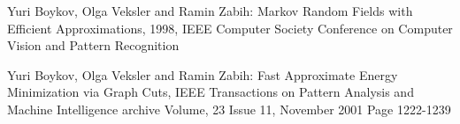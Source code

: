 \documentclass{scrartcl}[12pt, halfparskip]
\begin{document}
\begin{thebibliography}{9}

  Yuri Boykov, Olga Veksler and Ramin Zabih:
  Markov Random Fields with Efficient Approximations,
  1998,
  IEEE Computer Society Conference on Computer Vision and
  Pattern Recognition
  
  Yuri Boykov, Olga Veksler and Ramin Zabih:
  Fast Approximate Energy Minimization via Graph
  Cuts,
  IEEE Transactions on Pattern Analysis and Machine Intelligence archive Volume,
  23 Issue 11, November 2001 Page 1222-1239
  

  

\end{thebibliography}
\end{document}
